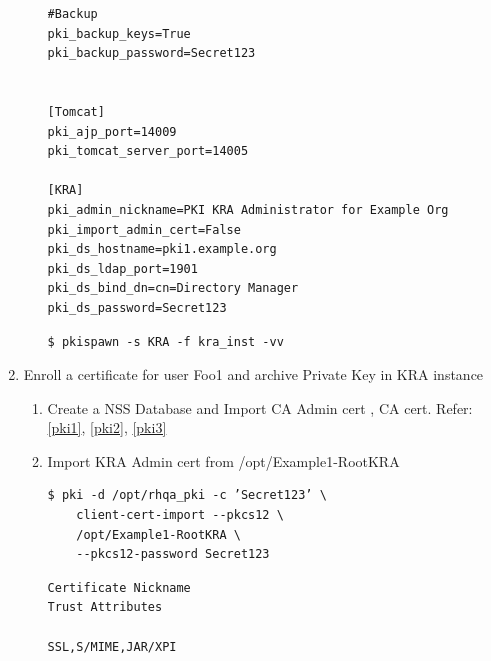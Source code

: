 \documentclass[a4paper]{article}
\begin{document}
\begin{enumerate}[label*=\arabic*.]
\begin{enumerate}[label*=\arabic*.]
\begin{lstlisting}
#Backup
pki_backup_keys=True
pki_backup_password=Secret123


[Tomcat]
pki_ajp_port=14009
pki_tomcat_server_port=14005

[KRA]
pki_admin_nickname=PKI KRA Administrator for Example Org
pki_import_admin_cert=False
pki_ds_hostname=pki1.example.org
pki_ds_ldap_port=1901
pki_ds_bind_dn=cn=Directory Manager
pki_ds_password=Secret123
                \end{lstlisting}
                \begin{lstlisting}[style=bashInputStyle]
$ pkispawn -s KRA -f kra_inst -vv            
                \end{lstlisting}
            \end{enumerate}
        \item \label{arch_privatekey} Enroll a certificate for user Foo1 and archive Private Key in KRA instance
            \begin{enumerate}[label*=\arabic*.]
                \item Create a NSS Database and Import CA Admin cert , CA cert. Refer:\ref{pki1}, \ref{pki2}, \ref{pki3}
                \item Import KRA Admin cert from /opt/Example1-RootKRA
                    \begin{lstlisting}[style=bashInputStyle]
$ pki -d /opt/rhqa_pki -c ’Secret123’ \
    client-cert-import --pkcs12 \
    /opt/Example1-RootKRA \
    --pkcs12-password Secret123
                    \end{lstlisting}
                    \begin{lstlisting}
Certificate Nickname                                         Trust Attributes
                                                             SSL,S/MIME,JAR/XPI


\end{lstlisting}
\end{enumerate}
\end{enumerate}
\end{document}
